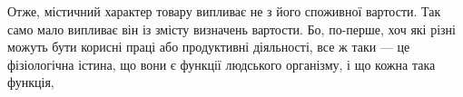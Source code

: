 Отже, містичний характер товару випливає не з його споживної
вартости. Так само мало випливає він із змісту визначень вартости.
Бо, по-перше, хоч які різні можуть бути корисні праці або продуктивні
діяльності, все ж таки — це фізіологічна істина, що
вони є функції людського організму, і що кожна така функція,
\parbreak{}  %
